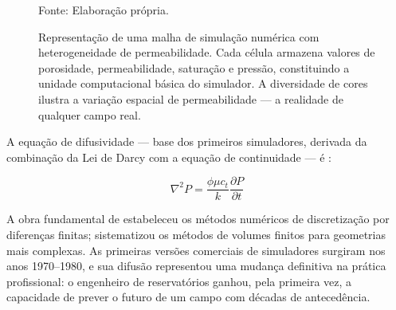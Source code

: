 \documentclass[
  12pt,
  a4paper,
  oneside,
  brazilian,
  sumario=tradicional
]{abntex2}
\renewcommand{\fonte}[1]{\vspace{2pt}\par\noindent\footnotesize Fonte: #1}
\begin{document}
\begin{figure}[H]
  \centering
  \caption{Representação de uma malha de simulação numérica com heterogeneidade de permeabilidade. Cada célula armazena valores de porosidade, permeabilidade, saturação e pressão, constituindo a unidade computacional básica do simulador. A diversidade de cores ilustra a variação espacial de permeabilidade — a realidade de qualquer campo real.}
  \label{fig:grid}
  \fonte{Elaboração própria.}
\end{figure}

A equação de difusividade — base dos primeiros simuladores, derivada
da combinação da Lei de Darcy com a equação de continuidade —
é \cite{rosa2006}:

\begin{equation}
  \nabla^2 P = \frac{\phi \mu c_t}{k}\frac{\partial P}{\partial t}
  \label{eq:difusividade}
\end{equation}

A obra fundamental de \cite{peaceman1977} estabeleceu os métodos
numéricos de discretização por diferenças finitas; \cite{aziz1979}
sistematizou os métodos de volumes finitos para geometrias mais
complexas. As primeiras versões comerciais de simuladores surgiram nos
anos 1970--1980, e sua difusão representou uma mudança definitiva na
prática profissional: o engenheiro de reservatórios ganhou, pela
primeira vez, a capacidade de prever o futuro de um campo com décadas
de antecedência.
\end{document}
